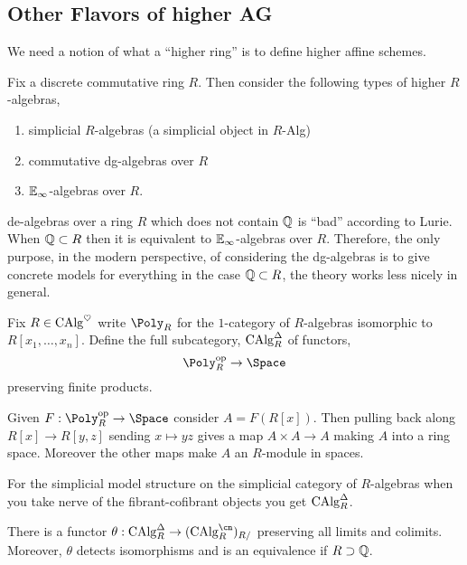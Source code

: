 \documentclass[12pt]{article}
\begin{document}
\subsection{Other Flavors of higher AG}

We need a notion of what a ``higher ring'' is to define higher affine schemes.

\begin{defn}
Fix a discrete commutative ring $R$. Then consider the following types of higher $R$-algebras,
\begin{enumerate}
\item simplicial $R$-algebras (a simplicial object in $R$-Alg)
\item commutative dg-algebras over $R$
\item $\mathbb{E}_\infty$-algebras over $R$.
\end{enumerate}
\end{defn}

\begin{rmk}
de-algebras over a ring $R$ which does not contain $\mathbb{Q}$ is ``bad'' according to Lurie. When $\mathbb{Q} \subset R$ then it is equivalent to $\mathbb{E}_\infty$-algebras over $R$. Therefore, the only purpose, in the modern perspective, of considering the dg-algebras is to give concrete models for everything in the case $\mathbb{Q} \subset R$, the theory works less nicely in general. 
\end{rmk}

\begin{defn}
Fix $R \in \mathrm{CAlg}^\heartsuit$ write $\Poly_R$ for the $1$-category of $R$-algebras isomorphic to $R[x_1, \dots, x_n]$. Define the full subcategory, $\mathrm{CAlg}_R^\Delta$ of functors,
\[ \Poly^\op_R \to \Space \]
preserving finite products. 
\end{defn}

\begin{rmk}
Given $F : \Poly_R^\op \to \Space$ consider $A = F(R[x])$. Then pulling back along $R[x] \to R[y,z]$ sending $x \mapsto yz$ gives a map $A \times A \to A$ making $A$ into a ring space. Moreover the other maps make $A$ an $R$-module in spaces.
\end{rmk}

\begin{rmk}
For the simplicial model structure on the simplicial category of $R$-algebras when you take nerve of the fibrant-cofibrant objects you get $\mathrm{CAlg}_R^\Delta$. 
\end{rmk}

\begin{theorem}[SAG, 25.1.2.2]
There is a functor $\theta : \CAlg_R^\Delta \to (\CAlg_R^\cn)_{R/}$ preserving all limits and colimits. Moreover, $\theta$ detects isomorphisms and is an equivalence if $R \supset \mathbb{Q}$.
\end{theorem}
\end{document}
